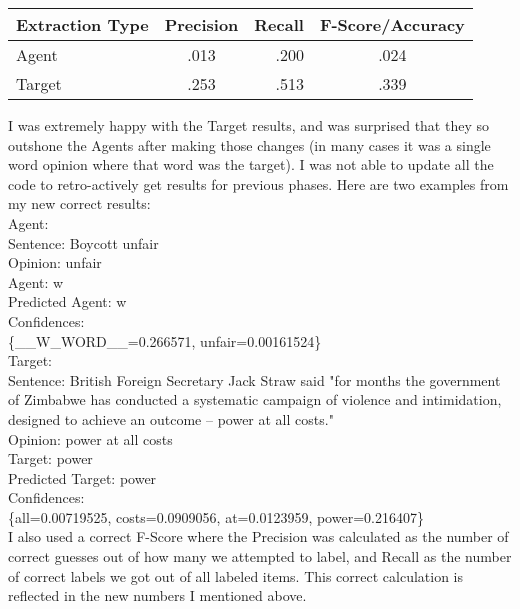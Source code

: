 \documentclass{article}
\begin{document}
    \begin{center}

        \begin{tabular}{ | l | c | r | c}
            \hline
            Extraction Type & Precision & Recall & F-Score/Accuracy \\ \hline
            Agent & .013 & .200 & .024\\ \hline
            Target & .253 & .513 & .339\\ \hline
        \end{tabular}
    \end{center}

    I was extremely happy with the Target results, and was surprised that they so outshone the Agents after making those changes (in many cases it was a single word opinion where that word was the target). I was not able to update all the code to retro-actively get results for previous phases. Here are two examples from my new correct results: \\

    Agent: \\
    Sentence: Boycott unfair\\
    Opinion: unfair\\
    Agent: w\\
    Predicted Agent: w\\
    Confidences:\\
    \{\_\_W\_WORD\_\_=0.266571, unfair=0.00161524\}\\

    Target:\\
    Sentence: British Foreign Secretary Jack Straw said "for months the government of Zimbabwe has conducted a systematic campaign of violence and intimidation, designed to achieve an outcome -- power at all costs."\\
    Opinion: power at all costs\\
    Target: power\\
    Predicted Target: power\\
    Confidences:\\
    \{all=0.00719525, costs=0.0909056, at=0.0123959, power=0.216407\}\\


    I also used a correct F-Score where the Precision was calculated as the number of correct guesses out of how many we attempted to label, and Recall as the number of correct labels we got out of all labeled items. This correct calculation is reflected in the new numbers I mentioned above.
\end{document}
